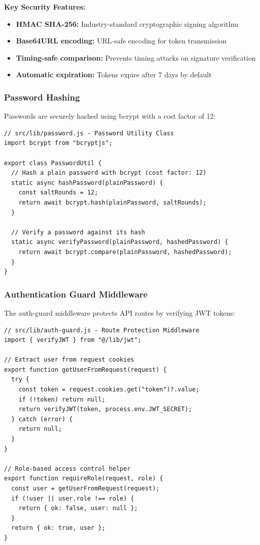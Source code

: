 \documentclass[12pt,a4paper]{article}
\begin{document}
\textbf{Key Security Features:}
\begin{itemize}[noitemsep]
    \item \textbf{HMAC SHA-256:} Industry-standard cryptographic signing algorithm
    \item \textbf{Base64URL encoding:} URL-safe encoding for token transmission
    \item \textbf{Timing-safe comparison:} Prevents timing attacks on signature verification
    \item \textbf{Automatic expiration:} Tokens expire after 7 days by default
\end{itemize}

\subsubsection{Password Hashing}

Passwords are securely hashed using bcrypt with a cost factor of 12:

\begin{verbatim}
// src/lib/password.js - Password Utility Class
import bcrypt from "bcryptjs";

export class PasswordUtil {
  // Hash a plain password with bcrypt (cost factor: 12)
  static async hashPassword(plainPassword) {
    const saltRounds = 12;
    return await bcrypt.hash(plainPassword, saltRounds);
  }

  // Verify a password against its hash
  static async verifyPassword(plainPassword, hashedPassword) {
    return await bcrypt.compare(plainPassword, hashedPassword);
  }
}
\end{verbatim}

\subsubsection{Authentication Guard Middleware}

The auth-guard middleware protects API routes by verifying JWT tokens:

\begin{verbatim}
// src/lib/auth-guard.js - Route Protection Middleware
import { verifyJWT } from "@/lib/jwt";

// Extract user from request cookies
export function getUserFromRequest(request) {
  try {
    const token = request.cookies.get("token")?.value;
    if (!token) return null;
    return verifyJWT(token, process.env.JWT_SECRET);
  } catch (error) {
    return null;
  }
}

// Role-based access control helper
export function requireRole(request, role) {
  const user = getUserFromRequest(request);
  if (!user || user.role !== role) {
    return { ok: false, user: null };
  }
  return { ok: true, user };
}
\end{verbatim}
\end{document}
